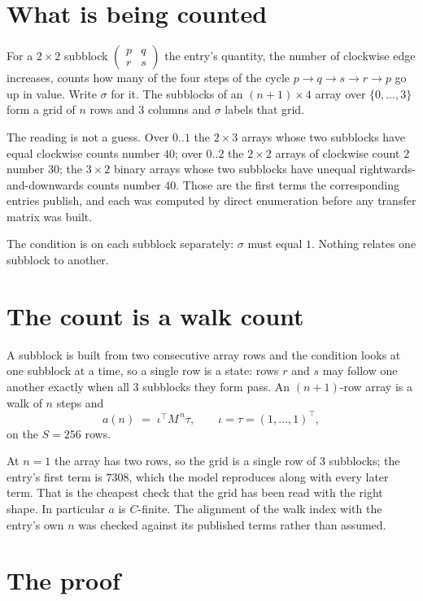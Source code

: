\documentclass[11pt,a4paper]{article}
\theoremstyle{plain}
\theoremstyle{definition}
\begin{document}
\section{What is being counted}

For a $2\times2$ subblock $\begin{pmatrix}p&q\\r&s\end{pmatrix}$ the
entry's quantity, the number of clockwise edge increases, counts how many of the four steps of the cycle $p\to q\to s\to r\to p$ go up in value. Write $\sigma$ for it. The subblocks of an
$(n+1)\times4$ array over $\{0,\dots,3\}$ form a grid of $n$ rows and $3$
columns and $\sigma$ labels that grid.

The reading is not a guess. Over $0..1$ the $2\times3$ arrays whose two subblocks have equal
clockwise counts number $40$; over $0..2$ the $2\times2$ arrays of clockwise count $2$ number
$30$; the $3\times2$ binary arrays whose two subblocks have unequal rightwards-and-downwards
counts number $40$. Those are the first terms the corresponding entries publish, and each was
computed by direct enumeration before any transfer matrix was built.

The condition is on each subblock separately: $\sigma$ must equal $1$. Nothing
relates one subblock to another.

\section{The count is a walk count}

A subblock is built from two consecutive array rows and the condition looks
at one subblock at a time, so a single row is a state: rows $r$ and $s$ may follow one another
exactly when all $3$ subblocks they form pass. An $(n+1)$-row array is a walk of $n$ steps and
\[
a(n)\;=\;\iota^{\!\top}M^{\,n}\tau,\qquad\iota=\tau=(1,\dots,1)^{\!\top},
\]
on the $S=256$ rows.

At $n=1$ the array has two rows, so the grid is a single row of $3$
subblocks; the entry's first term is $7308$, which the model
reproduces along with every later term. That is the cheapest check that the grid has been read
with the right shape.
In particular $a$ is $C$-finite. The alignment of the walk index with the entry's own $n$ was
checked against its published terms rather than assumed.

\section{The proof}
\end{document}
